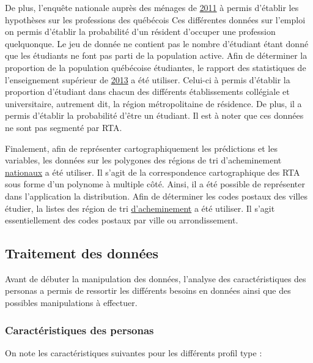 \documentclass[11pt,french]{report}\usepackage[]{graphicx}\usepackage[]{color}
\begin{document}
De plus, l'enquête nationale auprès des ménages de \href{http://www12.statcan.gc.ca/nhs-enm/2011/dp-pd/dt-td/Rp-fra.cfm?TABID=2&LANG=F&A=R&APATH=3&DETAIL=0&DIM=0&FL=A&FREE=0&GC=24&GL=-1&GID=1118301&GK=1&GRP=1&O=D&PID=106042&PRID=0&PTYPE=105277&S=0&SHOWALL=0&SUB=0&Temporal=2013&THEME=96&VID=0&VNAMEE=&VNAMEF=&D1=2&D2=0&D3=0&D4=0&D5=0&D6=0}{2011} à permis d'établir les hypothèses sur les professions des québécois Ces différentes données sur l'emploi on permis d'établir la probabilité d'un résident d'occuper une profession quelquonque. Le jeu de donnée ne contient pas le nombre d'étudiant étant donné que les étudiants ne font pas parti de la population active. Afin de déterminer la proportion de la population québécoise étudiantes, le rapport des statistiques de l'enseignement supérieur de \href{http://www.education.gouv.qc.ca/fileadmin/administration/librairies/documents/Ministere/acces_info/Statistiques/Statistiques_ES/Statistiques_enseignement_superieur_2013.pdf}{2013} a été utiliser. Celui-ci à permis d'établir la proportion d'étudiant dans chacun des différents établissements collégiale et universitaire, autrement dit, la région métropolitaine de résidence. De plus, il a permis d'établir la probabilité d'être un étudiant. Il est à noter que ces données ne sont pas segmenté par RTA.
\newline

Finalement, afin de représenter cartographiquement les prédictions et les variables, les données sur les polygones des régions de tri d'acheminement \href{http://www12.statcan.gc.ca/census-recensement/2011/geo/bound-limit/bound-limit-2016-fra.cfm}{nationaux} a été utiliser. Il s'agit de la correspondence cartographique des RTA sous forme d'un polynome à multiple côté. Ainsi, il a été possible de représenter dans l'application la distribution. Afin de déterminer les codes postaux des villes étudier, la listes des région de tri \href{https://fr.wikipedia.org/wiki/Liste_des_codes_postaux_canadiens_débutant_par_J}{d'acheminement} a été utiliser. Il s'agit essentiellement des codes postaux par ville ou arrondissement.


\subsection*{Traitement des données}
Avant de débuter la manipulation des données, l'analyse des caractéristiques des personas a permis de ressortir les différents besoins en données ainsi que des possibles manipulations à effectuer. 

\subsubsection*{Caractéristiques des personas}
On note les caractéristiques suivantes pour les différents profil type :
\end{document}
